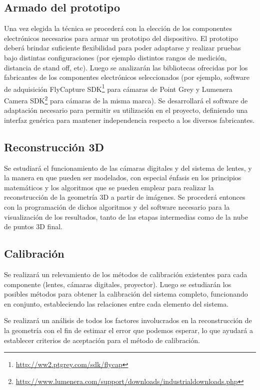 \subsection{Armado del prototipo}
Una vez elegida la técnica se procederá con la elección de los componentes electrónicos necesarios para armar un prototipo del dispositivo. El prototipo deberá brindar suficiente flexibilidad para poder adaptarse y realizar pruebas bajo distintas configuraciones (por ejemplo distintos rangos de medición, distancia de stand off, etc). Luego se analizarán las bibliotecas ofrecidas por los fabricantes de los componentes electrónicos seleccionados (por ejemplo, software de adquisición FlyCapture SDK\footnote{\url{http://ww2.ptgrey.com/sdk/flycap}} para cámaras de Point Grey y Lumenera Camera SDK\footnote{\url{http://www.lumenera.com/support/downloads/industrialdownloads.php}} para cámaras de la misma marca). Se desarrollará el software de adaptación necesario para permitir su utilización en el proyecto, definiendo una interfaz genérica para mantener independencia respecto a los diversos fabricantes.

\subsection{Reconstrucción 3D}
Se estudiará el funcionamiento de las cámaras digitales y del sistema de lentes, y la manera en que pueden ser modelados, con especial énfasis en los principios matemáticos y los algoritmos que se pueden emplear para realizar la reconstrucción de la geometría 3D a partir de imágenes. Se procederá entonces con la programación de dichos algoritmos y del software necesario para la visualización de los resultados, tanto de las etapas intermedias como de la nube de puntos 3D final.

\subsection{Calibración}
Se realizará un relevamiento de los métodos de calibración existentes para cada componente (lentes, cámaras digitales, proyector). Luego se estudiarán los posibles métodos para obtener la calibración del sistema completo, funcionando en conjunto, estableciendo las relaciones entre cada elemento del sistema.

Se realizará un análisis de todos los factores involucrados en la reconstrucción de la geometría con el fin de estimar el error que podemos esperar, lo que ayudará a establecer criterios de aceptación para el método de calibración. 

